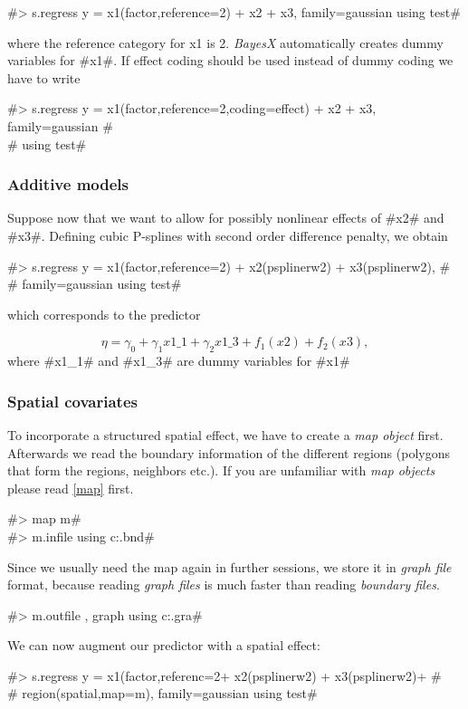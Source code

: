 #> s.regress y = x1(factor,reference=2) + x2 + x3, family=gaussian using test#

where the reference category for x1 is 2. {\em BayesX} automatically creates dummy variables for #x1#. If effect coding should be used instead of dummy coding
we have to write

#> s.regress y = x1(factor,reference=2,coding=effect) + x2 + x3, family=gaussian # \\
# using test#


\subsubsection*{Additive models}

Suppose now that we want to allow for possibly nonlinear effects
of #x2# and #x3#. Defining cubic P-splines with second order
difference penalty, we obtain

#> s.regress y = x1(factor,reference=2) + x2(psplinerw2) + x3(psplinerw2), # \\
# family=gaussian using test#

which corresponds to the predictor

$$
\eta = \gamma_0 + \gamma_1 x1\_1 + \gamma_2 x1\_3 + f_1(x2) + f_2(x3),
$$
where #x1_1# and #x1_3# are dummy variables for #x1#


\subsubsection*{Spatial covariates}

To incorporate a structured spatial effect, we have to create a {\em
map object} first. Afterwards we read the boundary information of
the different regions (polygons that form the regions, neighbors
etc.). If you are unfamiliar with {\em map objects} please read
\autoref{map} first.

#> map m# \\
#> m.infile using c:\maps\map.bnd#

Since we usually need the map again in further sessions, we store
it in {\em graph file} format, because reading {\em graph files}
is much faster than reading {\em boundary files}.

#> m.outfile , graph using c:\maps\mapgraph.gra#

We can now augment our predictor with a spatial effect:

 #> s.regress y = x1(factor,referenc=2+ x2(psplinerw2) + x3(psplinerw2)+ #\\
 #  region(spatial,map=m), family=gaussian using test#


